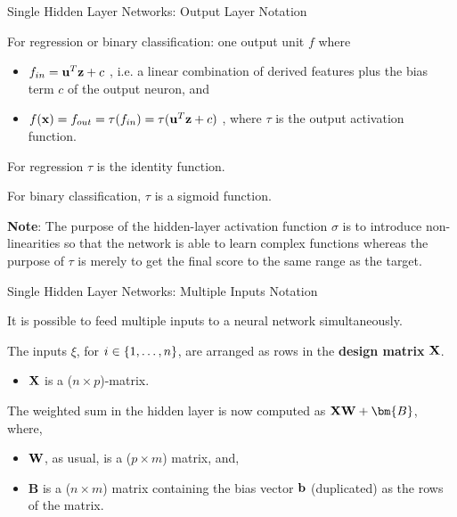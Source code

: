 \documentclass[11pt,compress,t,notes=noshow, xcolor=table]{beamer}
\begin{document}
\begin{framei}{Single Hidden Layer Networks: Output Layer Notation}

    \item For regression or binary classification: one output unit $f$ where
      \begin{itemize}
        \item $f_{in} = \mathbf{u}^T \mathbf{z} + c$ , i.e. a linear combination of derived features plus the bias term $c$ of the output neuron, and

        \item $f(\mathbf{x})= f_{out} = \tau(f_{in}) = \tau(\mathbf{u}^T \mathbf{z} + c)$ , where $\tau$ is the output activation function.
      \end{itemize}
    \item For regression $\tau$ is the identity function.
    \item For binary classification, $\tau$ is a sigmoid function.
    \item \textbf{Note}: The purpose of the hidden-layer activation function $\sigma$ is to introduce non-linearities so that the network is able to learn complex functions whereas the purpose of $\tau$ is merely to get the final score to the same range as the target.
\end{framei}

\begin{framei}{Single Hidden Layer Networks: Multiple Inputs Notation}

    \item It is possible to feed multiple inputs to a neural network simultaneously.

    \item The inputs $\xi$, for $i \in \{1, \ldots, n\}$, are arranged as rows in the \textbf{design matrix} $\mathbf{X}$.
    \begin{itemize}
      \item $\mathbf{X}$ is a ($n \times p$)-matrix.
    \end{itemize}

    \item The weighted sum in the hidden layer is now computed as $\Xmat\Wmat + \bm{B}$, where,
      \begin{itemize}
        \item $\mathbf{W}$, as usual, is a ($p \times m$) matrix, and,

        \item $\bm{B}$ is a ($n \times m$) matrix containing the bias vector $\mathbf{b}$ (duplicated) as the rows of the matrix.
      \end{itemize}

\end{framei}    
\end{document}
